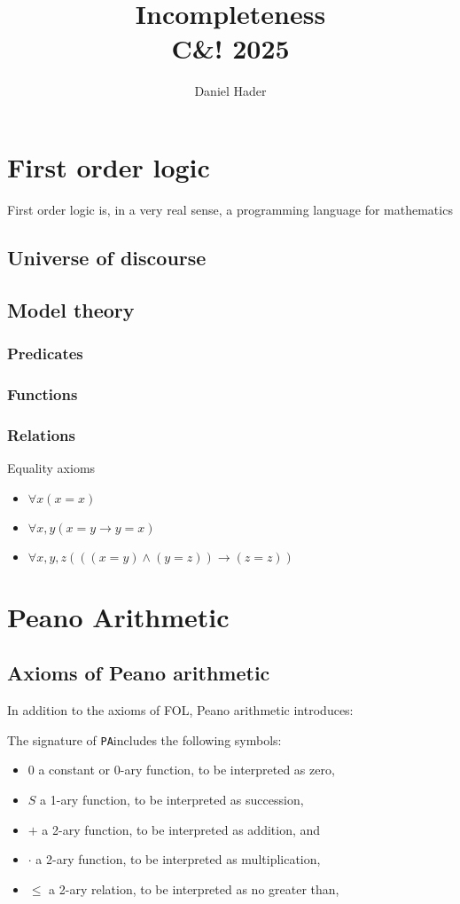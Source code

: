 \documentclass[12pt]{article}
\title{Incompleteness\\\large C\&! 2025}
\author{Daniel Hader}
\date{}
\newcommand{\PA}{\texttt{PA}}
\begin{document}
	\maketitle
	
	\section{First order logic}
	
	First order logic is, in a very real sense, a programming language for mathematics
	
	\subsection{Universe of discourse}
	\subsection{Model theory}
	\subsubsection{Predicates}
	\subsubsection{Functions}	
	\subsubsection{Relations}
	
	Equality axioms
	
	\begin{itemize}
		\item $\forall x (x = x)$
		\item $\forall x, y (x=y \to y=x)$
		\item $\forall x, y, z (((x=y) \land (y=z)) \to (z=z))$
	\end{itemize}
	
	\section{Peano Arithmetic}
	
	\subsection{Axioms of Peano arithmetic}
	In addition to the axioms of FOL, Peano arithmetic introduces:
	
	The signature of \PA includes the following symbols:
	\begin{itemize}
		\item $0$ a constant or 0-ary function, to be interpreted as zero,
		\item $S$ a 1-ary function, to be interpreted as succession,
		\item $+$ a 2-ary function, to be interpreted as addition, and
		\item $\cdot$ a 2-ary function, to be interpreted as multiplication,
		\item $\le$ a 2-ary relation, to be interpreted as no greater than,
	\end{itemize}
	
\end{document}
